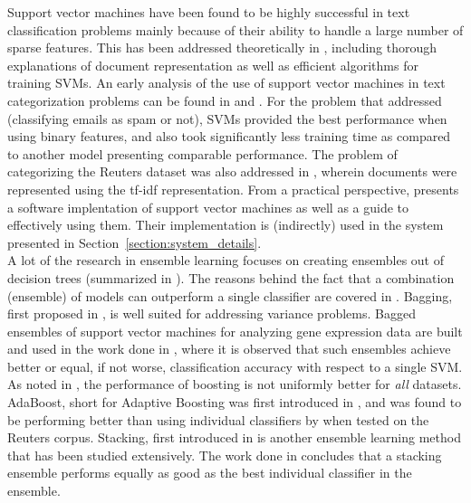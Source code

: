 Support vector machines have been found to be highly successful in text classification problems mainly because of their ability to handle a large number of sparse features. This has been addressed theoretically in \cite{joachims2002learning}, including thorough explanations of document representation as well as efficient algorithms for training SVMs. An early analysis of the use of support vector machines in text categorization problems can be found in \cite{joachims1998text} and \cite{drucker1999support}. For the problem that \cite{drucker1999support} addressed (classifying emails as spam or not), SVMs provided the best performance when using binary features, and also took significantly less training time as compared to another model presenting comparable performance. The problem of categorizing the Reuters \cite{reuters} dataset was also addressed in \cite{manevitz2002one}, wherein documents were represented using the tf-idf representation. From a practical perspective, \cite{hsu2003practical} presents a software implentation of support vector machines as well as a guide to effectively using them. Their implementation is (indirectly) used in the system presented in Section~\ref{section:system_details}.\\

A lot of the research in ensemble learning focuses on creating ensembles out of decision trees (summarized in \cite{safavian1991survey}). The reasons behind the fact that a combination (ensemble) of models can outperform a single classifier are covered in \cite{valentini2002ensembles}. Bagging, first proposed in \cite{breiman1996bagging}, is well suited for addressing variance problems. Bagged ensembles of support vector machines for analyzing gene expression data are built and used in the work done in \cite{valentini2003bagged}, where it is observed that such ensembles achieve better or equal, if not worse, classification accuracy with respect to a single SVM. As noted in \cite{bauer1999empirical}, the performance of boosting is not uniformly better for \emph{all} datasets. AdaBoost, short for Adaptive Boosting was first introduced in \cite{freund1999short}, and was found to be performing better than using individual classifiers by \cite{bloehdorn2004text} when tested on the Reuters \cite{reuters} corpus. Stacking, first introduced in \cite{wolpert1992stacked} is another ensemble learning method that has been studied extensively. The work done in \cite{dvzeroski2004combining} concludes that a stacking ensemble performs equally as good as the best individual classifier in the ensemble.\\

